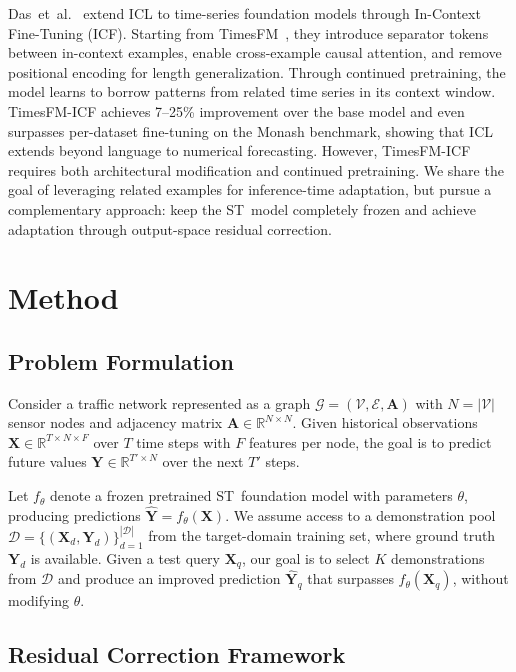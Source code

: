 \documentclass[conference]{IEEEtran}
\begin{document}
Das~et~al.~\cite{das2024icf} extend ICL to time-series foundation models through In-Context Fine-Tuning (ICF).
Starting from TimesFM~\cite{das2024timesfm}, they introduce separator tokens between in-context examples, enable cross-example causal attention, and remove positional encoding for length generalization.
Through continued pretraining, the model learns to borrow patterns from related time series in its context window.
TimesFM-ICF achieves 7--25\% improvement over the base model and even surpasses per-dataset fine-tuning on the Monash benchmark, showing that ICL extends beyond language to numerical forecasting.
However, TimesFM-ICF requires both architectural modification and continued pretraining.
We share the goal of leveraging related examples for inference-time adaptation, but pursue a complementary approach: keep the ST~model completely frozen and achieve adaptation through output-space residual correction.

\section{Method}

\subsection{Problem Formulation}

Consider a traffic network represented as a graph $\mathcal{G} = (\mathcal{V}, \mathcal{E}, \mathbf{A})$ with $N = |\mathcal{V}|$ sensor nodes and adjacency matrix $\mathbf{A} \in \mathbb{R}^{N \times N}$.
Given historical observations $\mathbf{X} \in \mathbb{R}^{T \times N \times F}$ over $T$ time steps with $F$ features per node, the goal is to predict future values $\mathbf{Y} \in \mathbb{R}^{T' \times N}$ over the next $T'$ steps.

Let $f_\theta$ denote a frozen pretrained ST~foundation model with parameters $\theta$, producing predictions $\hat{\mathbf{Y}} = f_\theta(\mathbf{X})$.
We assume access to a demonstration pool $\mathcal{D} = \{(\mathbf{X}_d, \mathbf{Y}_d)\}_{d=1}^{|\mathcal{D}|}$ from the target-domain training set, where ground truth $\mathbf{Y}_d$ is available.
Given a test query $\mathbf{X}_q$, our goal is to select $K$ demonstrations from $\mathcal{D}$ and produce an improved prediction $\hat{\mathbf{Y}}_q$ that surpasses $f_\theta(\mathbf{X}_q)$, without modifying $\theta$.

\subsection{Residual Correction Framework}
\end{document}
